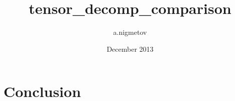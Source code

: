 \documentclass[12pt]{report}
\title{tensor_decomp_comparison}
\author{a.nigmetov }
\date{December 2013}
\begin{document}
\tableofcontents

% 













\chapter{Conclusion}




{}

\end{document}
